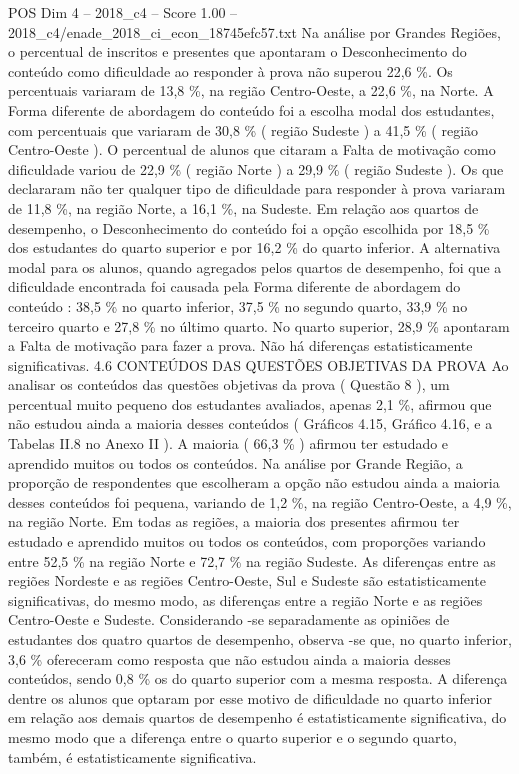 \begin{textsample}{POS Dim 4 – 2018\_c4 – Score 1.00 – 2018\_c4/enade\_2018\_ci\_econ\_18745efc57.txt}
Na análise por Grandes Regiões, o percentual de inscritos e presentes que apontaram o Desconhecimento do conteúdo como dificuldade ao responder à prova não superou 22,6 \%.
Os percentuais variaram de 13,8 \%, na região Centro-Oeste, a 22,6 \%, na Norte.
A Forma diferente de abordagem do conteúdo foi a escolha modal dos estudantes, com percentuais que variaram de 30,8 \% ( região Sudeste ) a 41,5 \% ( região Centro-Oeste ).
O percentual de alunos que citaram a Falta de motivação como dificuldade variou de 22,9 \% ( região Norte ) a 29,9 \% ( região Sudeste ).
Os que declararam não ter qualquer tipo de dificuldade para responder à prova variaram de 11,8 \%, na região Norte, a 16,1 \%, na Sudeste.
Em relação aos quartos de desempenho, o Desconhecimento do conteúdo foi a opção escolhida por 18,5 \% dos estudantes do quarto superior e por 16,2 \% do quarto inferior.
A alternativa modal para os alunos, quando agregados pelos quartos de desempenho, foi que a dificuldade encontrada foi causada pela Forma diferente de abordagem do conteúdo : 38,5 \% no quarto inferior, 37,5 \% no segundo quarto, 33,9 \% no terceiro quarto e 27,8 \% no último quarto.
No quarto superior, 28,9 \% apontaram a Falta de motivação para fazer a prova.
Não há diferenças estatisticamente significativas. 4.6 CONTEÚDOS DAS QUESTÕES OBJETIVAS DA PROVA Ao analisar os conteúdos das questões objetivas da prova ( Questão 8 ), um percentual muito pequeno dos estudantes avaliados, apenas 2,1 \%, afirmou que não estudou ainda a maioria desses conteúdos ( Gráficos 4.15, Gráfico 4.16, e a Tabelas II.8 no Anexo II ).
A maioria ( 66,3 \% ) afirmou ter estudado e aprendido muitos ou todos os conteúdos.
Na análise por Grande Região, a proporção de respondentes que escolheram a opção não estudou ainda a maioria desses conteúdos foi pequena, variando de 1,2 \%, na região Centro-Oeste, a 4,9 \%, na região Norte.
Em todas as regiões, a maioria dos presentes afirmou ter estudado e aprendido muitos ou todos os conteúdos, com proporções variando entre 52,5 \% na região Norte e 72,7 \% na região Sudeste.
As diferenças entre as regiões Nordeste e as regiões Centro-Oeste, Sul e Sudeste são estatisticamente significativas, do mesmo modo, as diferenças entre a região Norte e as regiões Centro-Oeste e Sudeste.
Considerando -se separadamente as opiniões de estudantes dos quatro quartos de desempenho, observa -se que, no quarto inferior, 3,6 \% ofereceram como resposta que não estudou ainda a maioria desses conteúdos, sendo 0,8 \% os do quarto superior com a mesma resposta.
A diferença dentre os alunos que optaram por esse motivo de dificuldade no quarto inferior em relação aos demais quartos de desempenho é estatisticamente significativa, do mesmo modo que a diferença entre o quarto superior e o segundo quarto, também, é estatisticamente significativa.

\end{textsample}
